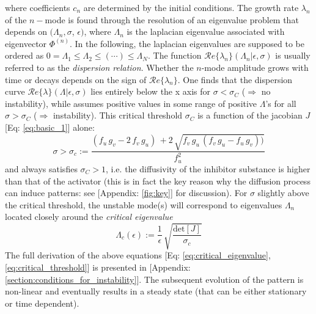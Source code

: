 where coefficients $c_n$ are determined by the initial conditions. The growth rate $\lambda_n$ of the $n-$mode is found through the resolution of an eigenvalue problem that depends on $(\Lambda_n, \sigma$, $\epsilon)$, where $\Lambda_n$ is the laplacian eigenvalue associated with eigenvector $\Phi^{(n)}$. In the following, the laplacian eigenvalues are supposed to be ordered as $0= \Lambda_1 \leq \Lambda_2 \leq (\cdots) \leq \Lambda_N$. The function $\mathcal{R}e\{\lambda_n\} (\Lambda_n | \epsilon, \sigma)$ is usually referred to as the \textit{dispersion relation}.
Whether the $n$-mode amplitude grows with time or decays depends on the sign of $\mathcal{R}e\{\lambda_n\}$. One finds that the dispersion curve $\mathcal{R}e\{\lambda\}(\Lambda|\epsilon, \sigma)$ lies entirely below the x axis for $\sigma < \sigma_C$ ($\Rightarrow$ no instability), while assumes positive values in some range of positive $\Lambda$'s for all $\sigma > \sigma_C$ ($\Rightarrow$ instability). This critical threshold $\sigma_C$ is a function of the jacobian $J$ [Eq: \ref{eq:basic_1}] alone:
\begin{equation}
 \sigma > \sigma_c :=  \frac{(f_u\,g_v - 2\,f_v\,g_u)\, + 2\,\sqrt{f_v\,g_u\,(f_v\,g_u-f_u\,g_v))}}{f_u^2}
 \label{eq:critical_threshold}
\end{equation}
and always satisfies $\sigma_C > 1$, i.e. the diffusivity of the inhibitor substance is higher than that of the activator (this is in fact the key reason why the diffusion process can induce patterns: see [Appendix: \ref{fig:key}] for discussion). \newline \noindent
For $\sigma$ slightly above the critical threshold, the unstable mode(s) will correspond to eigenvalues $\Lambda_n$ located closely around the \textit{critical eigenvalue}
\begin{equation}
    \Lambda_c(\epsilon) := \frac{1}{\epsilon}\,\sqrt{\frac{\text{det}[J]}{\sigma_c}}
    \label{eq:critical_eigenvalue}
\end{equation}
The full derivation of the above equations [Eq: \ref{eq:critical_eigenvalue}, \ref{eq:critical_threshold}] is presented in [Appendix: \ref{section:conditions_for_instability}]. \newline \noindent
The subsequent evolution of the pattern is non-linear and eventually results in a steady state (that can be either stationary or time dependent).  \bigskip \newline \noindent

